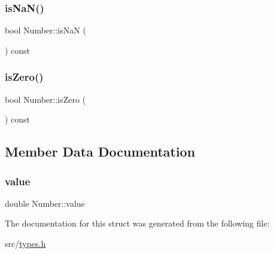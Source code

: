 \subsubsection{\texorpdfstring{is\+Na\+N()}{isNaN()}}
{\footnotesize\ttfamily bool Number\+::is\+NaN (\begin{DoxyParamCaption}{ }\end{DoxyParamCaption}) const\hspace{0.3cm}{\ttfamily [inline]}}

\mbox{\label{struct_number_a81a3c3689b85c8fe4ad70a275c8ba1b6}} 
\subsubsection{\texorpdfstring{is\+Zero()}{isZero()}}
{\footnotesize\ttfamily bool Number\+::is\+Zero (\begin{DoxyParamCaption}{ }\end{DoxyParamCaption}) const\hspace{0.3cm}{\ttfamily [inline]}}



\subsection{Member Data Documentation}
\mbox{\label{struct_number_a39c0611c6e740a144f7450fe529f8f1e}} 
\subsubsection{\texorpdfstring{value}{value}}
{\footnotesize\ttfamily double Number\+::value}



The documentation for this struct was generated from the following file\+:\begin{DoxyCompactItemize}
\item 
src/\hyperlink{types_8h}{types.\+h}\end{DoxyCompactItemize}

